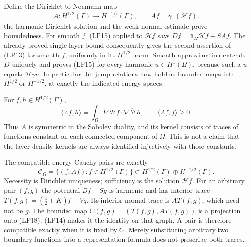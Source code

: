 \documentclass[
  11pt,
]{article}
\makeatletter
\let\ReaderOriginalAnchorStart\hyper@anchorstart
\let\ReaderOriginalAnchorEnd\hyper@anchorend
\let\ReaderPendingAliases\@empty
\def\ReaderArmAliases#1{\gdef\ReaderPendingAliases{#1}}
\def\hyper@anchorstart#1{\ReaderIfNativeAnchorTF{#1}{\ReaderPendingAliases\global\let\ReaderPendingAliases\@empty}{}\ReaderOriginalAnchorStart{#1}}
\makeatother
\begin{document}
Define the Dirichlet-to-Neumann map \[
 A:H^{1/2}(\Gamma)\to H^{-1/2}(\Gamma),\qquad Af=\gamma_1(\mathcal H f).
 \tag{LP16}
\] the harmonic Dirichlet solution and the weak normal estimate prove
boundedness. For smooth \(f\), (LP15) applied to \(\mathcal H f\) says
\(Df=\mathbf1_\Omega \mathcal H f+SAf\). The already proved single-layer
bound consequently gives the second assertion of (LP13) for smooth
\(f\), uniformly in its \(H^{1/2}\) norm. Smooth approximation extends
\(D\) uniquely and proves (LP15) for every harmonic
\(u\in H^1(\Omega)\), because such a \(u\) equals
\(\mathcal H\gamma u\). In particular the jump relations now hold as
bounded maps into \(H^{1/2}\) or \(H^{-1/2}\), at exactly the indicated
energy spaces.

For \(f,h\in H^{1/2}(\Gamma)\), \[
 \langle Af,h\rangle
 =\int_\Omega\nabla \mathcal H f\cdot\overline{\nabla \mathcal H h},\qquad
 \langle Af,f\rangle\ge0.
 \tag{LP17}
\] Thus \(A\) is symmetric in the Sobolev duality, and its kernel
consists of traces of functions constant on each connected component of
\(\Omega\). This is not a claim that the layer density kernels are
always identified injectively with those constants.

The compatible energy Cauchy pairs are exactly \[
 \mathcal C_\Omega
 =\{(f,Af):f\in H^{1/2}(\Gamma)\}
 \subset H^{1/2}(\Gamma)\oplus H^{-1/2}(\Gamma).
 \tag{LP18}
\] Necessity is Dirichlet uniqueness; sufficiency is the solution
\(\mathcal H f\). For an arbitrary pair \((f,g)\) the potential
\(Df-Sg\) is harmonic and has interior trace
\(T(f,g)=(\tfrac12+K)f-Vg\). Its interior normal trace is \(A T(f,g)\),
which need not be \(g\). The bounded map \(C(f,g)=(T(f,g),AT(f,g))\) is
a projection onto (LP18): (LP14) makes it the identity on that graph. A
pair is therefore compatible exactly when it is fixed by \(C\). Merely
substituting arbitrary two boundary functions into a representation
formula does not prescribe both traces.

\ReaderArmAliases{\ReaderOriginalAnchorStart{AN03-SBD-014}\ReaderOriginalAnchorEnd\begingroup\expandafter\def\csname @currentHref\endcsname{AN03-SBD-014}\label{AN03-SBD-014}\endgroup\ReaderOriginalAnchorStart{an03-sbd-014-fredholm-equations-with-their-actual-defects}\ReaderOriginalAnchorEnd\begingroup\expandafter\def\csname @currentHref\endcsname{an03-sbd-014-fredholm-equations-with-their-actual-defects}\label{an03-sbd-014-fredholm-equations-with-their-actual-defects}\endgroup\ReaderOriginalAnchorStart{14-fredholm-equations-with-their-actual-defects}\ReaderOriginalAnchorEnd\begingroup\expandafter\def\csname @currentHref\endcsname{14-fredholm-equations-with-their-actual-defects}\label{14-fredholm-equations-with-their-actual-defects}\endgroup\ReaderOriginalAnchorStart{fredholm-equations-with-their-actual-defects}\ReaderOriginalAnchorEnd}
\end{document}
